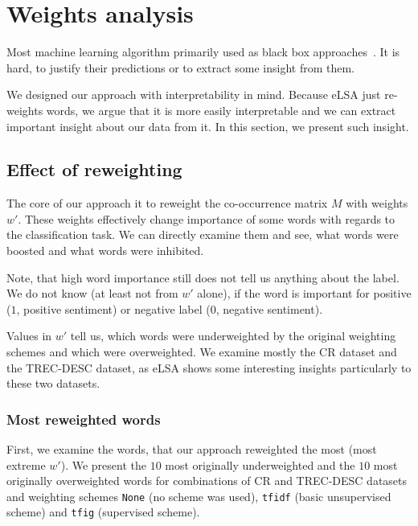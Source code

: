 \section{Weights analysis} \label{chap:weight:analysis}

    Most machine learning algorithm primarily used as black box approaches~\cite{ribeiro2016should}. %
    It is hard, to justify their predictions or to extract some insight from them. 
    
    We designed our approach with interpretability in mind.
    Because eLSA just re-weights words, we argue that it is more easily interpretable and we can extract important insight about our data from it.
    In this section, we present such insight.
    
    \subsection{Effect of reweighting}
    The core of our approach it to reweight the co-occurrence matrix $M$ with weights $w'$. 
    These weights effectively change importance of some words with regards to the classification task.
    We can directly examine them and see, what words were boosted and what words were inhibited.
    
    Note, that high word importance still does not tell us anything about the label. 
    We do not know (at least not from $w'$ alone), if the word is important for positive ($1$, positive sentiment) or negative label ($0$, negative sentiment).
    
    Values in $w'$ tell us, which words were underweighted by the original weighting schemes and which were overweighted.
    We examine mostly the CR dataset and the TREC-DESC dataset, as eLSA shows some interesting insights particularly to these two datasets.

    \subsubsection{Most reweighted words}
    
    First, we examine the words, that our approach reweighted the most (most extreme $w'$).
    We present the $10$ most originally underweighted and the $10$ most originally overweighted words for combinations of CR and TREC-DESC datasets and weighting schemes \texttt{None} (no scheme was used), \texttt{tfidf} (basic unsupervised scheme) and \texttt{tfig} (supervised scheme).
    

